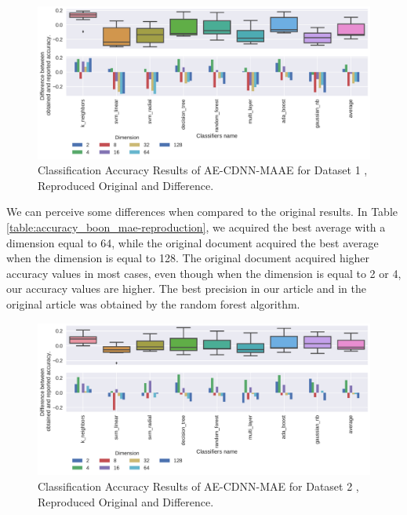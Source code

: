 \begin{figure}[!ht]
  \centering
  \includegraphics[width=0.8\linewidth]{figure/table_3.pdf}
  \caption{Classification Accuracy Results of AE-CDNN-MAAE for Dataset 1 \cite{WenZha:2018}, Reproduced Original and Difference.}
\label{fig:acc-AE-CDNN-MAAE-d1}
\end{figure}

We can perceive some differences when compared to the original results. In Table \ref{table:accuracy_boon_mae-reproduction}, we acquired the best average with a dimension equal to 64, while the original document acquired the best average when the dimension is equal to 128. The original document acquired higher accuracy values in most cases, even though when the dimension is equal to 2 or 4, our accuracy values are higher. The best precision in our article and in the original article was obtained by the random forest algorithm.








\begin{figure}[!ht]
  \centering
  \includegraphics[width=\linewidth]{figure/table_4.pdf}
  \caption{Classification Accuracy Results of AE-CDNN-MAE for Dataset 2 \cite{WenZha:2018}, Reproduced Original and Difference.}
\label{fig:acc-AE-CDNN-MAE-d2}
\end{figure}

